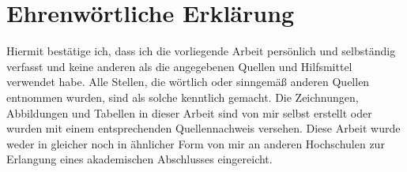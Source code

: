 \section{Ehrenwörtliche Erklärung}									%

Hiermit bestätige ich, dass ich die vorliegende Arbeit persönlich und selbständig verfasst und keine anderen als die angegebenen Quellen und Hilfsmittel verwendet habe. Alle Stellen, die wörtlich oder sinngemäß anderen Quellen entnommen wurden, sind als solche kenntlich gemacht. Die Zeichnungen, Abbildungen und Tabellen in dieser Arbeit sind von mir selbst erstellt oder wurden mit einem entsprechenden Quellennachweis versehen. Diese Arbeit wurde weder in gleicher noch in ähnlicher Form von mir an anderen Hochschulen zur Erlangung eines akademischen Abschlusses eingereicht. 
